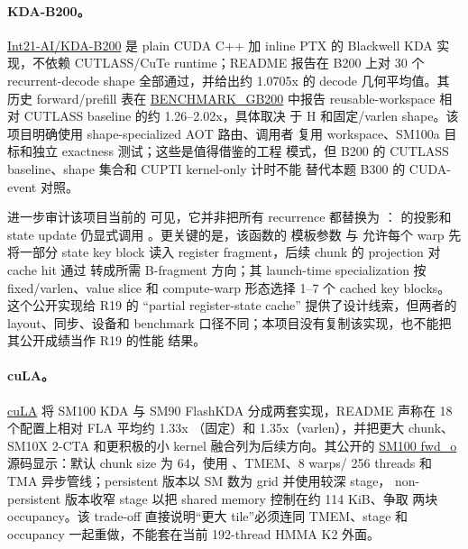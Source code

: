 \paragraph{KDA-B200。}
\href{https://github.com/Int21-AI/KDA-B200}{Int21-AI/KDA-B200} 是 plain CUDA
C++ 加 inline PTX 的 Blackwell KDA 实现，不依赖 CUTLASS/CuTe runtime；README
报告在 B200 上对 30 个 recurrent-decode shape 全部通过，并给出约
1.0705x 的 decode 几何平均值。其历史 forward/prefill 表在
\href{https://github.com/Int21-AI/KDA-B200/blob/main/BENCHMARK_GB200.md}{BENCHMARK\_GB200}
中报告 reusable-workspace 相对 CUTLASS baseline 的约 1.26--2.02x，具体取决
于 H 和固定/varlen shape。该项目明确使用 shape-specialized AOT 路由、调用者
复用 workspace、SM100a 目标和独立 exactness 测试；这些是值得借鉴的工程
模式，但 B200 的 CUTLASS baseline、shape 集合和 CUPTI kernel-only 计时不能
替代本题 B300 的 CUDA-event 对照。

进一步审计该项目当前的
\href{https://github.com/Int21-AI/KDA-B200/blob/main/csrc/flash_kda_cuda.cu}
{} 可见，它并非把所有 recurrence 都替换为
： 的投影和 state
update 仍显式调用 。更关键的是，该函数的
模板参数  与  允许每个
warp 先将一部分 state key block 读入  register fragment，后续
chunk 的 projection 对 cache hit 通过  转成所需
B-fragment 方向；其 launch-time specialization 按 fixed/varlen、value slice 和
compute-warp 形态选择 1--7 个 cached key blocks。这个公开实现给 R19 的
``partial register-state cache'' 提供了设计线索，但两者的 layout、同步、设备和
benchmark 口径不同；本项目没有复制该实现，也不能把其公开成绩当作 R19 的性能
结果。

\paragraph{cuLA。}
\href{https://github.com/inclusionAI/cuLA}{cuLA} 将 SM100 KDA 与 SM90
FlashKDA 分成两套实现，README 声称在 18 个配置上相对 FLA 平均约 1.33x
（固定）和 1.35x（varlen），并把更大 chunk、SM10X 2-CTA 和更积极的小 kernel
融合列为后续方向。其公开的
\href{https://raw.githubusercontent.com/inclusionAI/cuLA/main/cula/ops/kda/sm100/fwd_o.py}{SM100
fwd\_o} 源码显示：默认 chunk size 为 64，使用 、TMEM、8 warps/
256 threads 和 TMA 异步管线；persistent 版本以 SM 数为 grid 并使用较深 stage，
non-persistent 版本收窄 stage 以把 shared memory 控制在约 114 KiB、争取
两块 occupancy。该 trade-off 直接说明“更大 tile”必须连同 TMEM、stage 和
occupancy 一起重做，不能套在当前 192-thread HMMA K2 外面。

